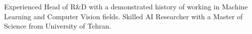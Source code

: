 \documentclass[9pt]{developercv} %
\begin{document}
\vspace{0.5cm}



\begin{minipage}[t]{0.4\textwidth} %
	\vspace{-\baselineskip} %
		Experienced Head of R\&D  with a demonstrated history of working in Machine Learning and Computer Vision fields. Skilled AI Researcher with a Master of Science from University of Tehran.  %

\begin{center}
\end{center}

\end{minipage}
\hfill %
\begin{minipage}[t]{0.5\textwidth} %
	\vspace{-\baselineskip} %
	\begin{barchart}{5.5}
	\end{barchart}
\end{minipage}




\end{document}
